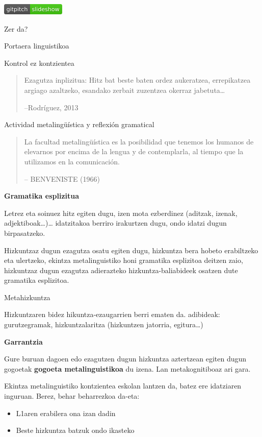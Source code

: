 \documentclass[
]{book}
\providecommand{\tightlist}{%
  \setlength{\itemsep}{0pt}\setlength{\parskip}{0pt}}
\begin{document}
\href{../Diapoak/07_GogoMetaDiapo.html}{\includegraphics{assets/badge.png}}

Zer da?

Portaera linguistikoa

Kontrol ez kontzientea

\begin{quote}
Ezagutza inplizitua: Hitz bat beste baten ordez aukeratzea, errepikatzea argiago azaltzeko, esandako zerbait zuzentzea okerraz jabetuta\ldots{}

--Rodríguez, 2013
\end{quote}

Actividad metalingüística y reflexión gramatical

\begin{quote}
La facultad metalingüística es la posibilidad que tenemos los humanos de elevarnos por encima de la lengua y de contemplarla, al tiempo que la utilizamos en la comunicación.

-- BENVENISTE (1966)
\end{quote}

\textbf{Gramatika esplizitua}

Letrez eta soinuez hitz egiten dugu, izen mota ezberdinez (aditzak, izenak, adjektiboak\ldots)\ldots{} idatzitakoa berriro irakurtzen dugu, ondo idatzi dugun birpasatzeko.

Hizkuntzaz dugun ezagutza osatu egiten dugu, hizkuntza bera hobeto erabiltzeko eta ulertzeko, ekintza metalinguistiko honi gramatika esplizitoa deitzen zaio, hizkuntzaz dugun ezagutza adierazteko hizkuntza-baliabideek osatzen dute gramatika esplizitoa.

Metahizkuntza

Hizkuntzaren bidez hikuntza-ezaugarrien berri ematen da. adibideak: gurutzegramak, hizkuntzalaritza (hizkuntzen jatorria, egitura\ldots)

\textbf{Garrantzia}

Gure buruan dagoen edo ezagutzen dugun hizkuntza aztertzean egiten dugun gogoetak \textbf{gogoeta metalinguistikoa} du izena. Lan metakognitiboaz ari gara.

Ekintza metalinguistiko kontzientea eskolan lantzen da, batez ere idatziaren inguruan. Berez, behar beharrezkoa da-eta:

\begin{itemize}
\tightlist
\item
  L1aren erabilera ona izan dadin
\item
  Beste hizkuntza batzuk ondo ikasteko
\end{itemize}
\end{document}
